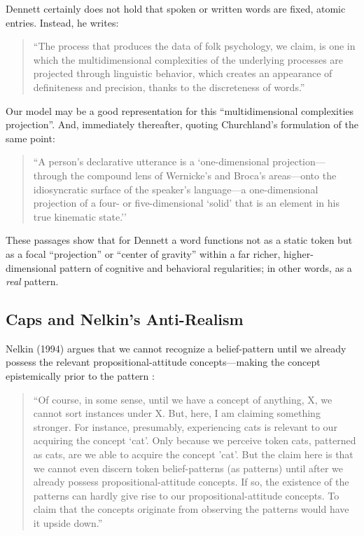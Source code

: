 \documentclass[12pt]{article}
\begin{document}
Dennett certainly does not hold that spoken or written words are fixed, atomic entries. Instead, he writes:

\begin{quote}
``The process that produces the data of folk psychology, we claim, is one in which the multidimensional complexities of the underlying processes are projected through linguistic behavior, which creates an appearance of definiteness and precision, thanks to the discreteness of words.'' \cite{ref-dennettRealPatterns1991}
\end{quote}

Our model may be a good representation for this ``multidimensional complexities projection''. And, immediately thereafter, quoting Churchland's formulation of the same point:

\begin{quote}
``A person's declarative utterance is a `one-dimensional projection---through the compound lens of Wernicke's and Broca's areas---onto the idiosyncratic surface of the speaker's language---a one-dimensional projection of a four- or five-dimensional `solid' that is an element in his true kinematic state.'' \cite{ref-churchlandNeurocomputational2000}
\end{quote}

These passages show that for Dennett a word functions not as a static token but as a focal ``projection'' or ``center of gravity'' within a far richer, higher-dimensional pattern of cognitive and behavioral regularities; in other words, as a \emph{real} pattern.

\subsection{Caps and Nelkin's Anti-Realism}\label{caps-and-nelkins-anti-realism}

Nelkin (1994) argues that we cannot recognize a belief-pattern until we already possess the relevant propositional-attitude concepts---making the concept epistemically prior to the pattern \cite{ref-nelkinPatterns1994}:

\begin{quote}
``Of course, in some sense, until we have a concept of anything, X, we cannot sort instances under X. But, here, I am claiming something stronger. For instance, presumably, experiencing cats is relevant to our acquiring the concept `cat'. Only because we perceive token cats, patterned as cats, are we able to acquire the concept 'cat'. But the claim here is that we cannot even discern token belief-patterns (as patterns) until after we already possess propositional-attitude concepts. If so, the existence of the patterns can hardly give rise to our propositional-attitude concepts. To claim that the concepts originate from observing the patterns would have it upside down.''
\end{quote}
\end{document}
